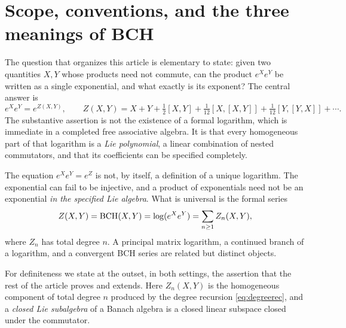 \section{Scope, conventions, and the three meanings of BCH}\label{sec:scope}
The question that organizes this article is elementary to state: given two
quantities $X,Y$ whose products need not commute, can the product $e^Xe^Y$ be
written as a single exponential, and what exactly is its exponent? The central
answer is
\begin{equation}\label{eq:main}
 e^Xe^Y=e^{Z(X,Y)},\qquad
 Z(X,Y)=X+Y+\tfrac12[X,Y]+\tfrac1{12}[X,[X,Y]]+\tfrac1{12}[Y,[Y,X]]+\cdots.
\end{equation}
The substantive assertion is not the existence of a formal logarithm, which is
immediate in a completed free associative algebra. It is that every homogeneous
part of that logarithm is a \emph{Lie polynomial}, a linear combination of
nested commutators, and that its coefficients can be specified completely.

The equation $e^Xe^Y=e^Z$ is not, by itself, a definition of a unique
logarithm. The exponential can fail to be injective, and a product of
exponentials need not be an exponential \emph{in the specified Lie algebra}.
What is universal is the formal series
\begin{equation}\label{eq:formalbch}
 Z(X,Y)=\operatorname{BCH}(X,Y)=\log(e^Xe^Y)=\sum_{n\geq1}Z_n(X,Y),
\end{equation}
where $Z_n$ has total degree $n$. A principal matrix logarithm, a continued
branch of a logarithm, and a convergent BCH series are related but distinct
objects.

For definiteness we state at the outset, in both settings, the assertion that
the rest of the article proves and extends. Here $Z_n(X,Y)$ is the
homogeneous component of total degree $n$ produced by the degree recursion
\eqref{eq:degreerec}, and a \emph{closed Lie subalgebra} of a Banach algebra
is a closed linear subspace closed under the commutator.

